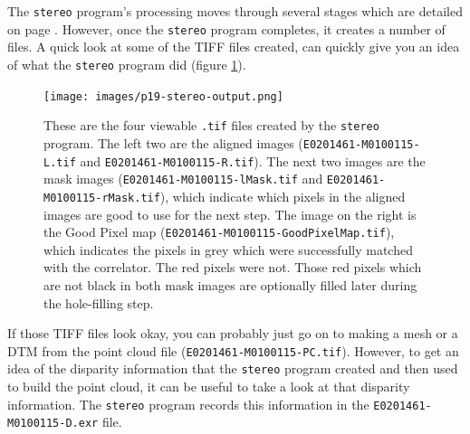 The \texttt{stereo} program's processing moves through several
stages which are detailed on page \pageref{entrypoints}.  However,
once the \texttt{stereo} program completes, it creates a number of
files.  A quick look at some of the TIFF files created, can quickly
give you an idea of what the \texttt{stereo} program did (figure
\ref{p19-stereo-output}).


\begin{figure}
\begin{center}
\texttt{[image: images/p19-stereo-output.png]}
\caption[P19 stereo output images]{
    \label{p19-stereo-output}
	These are the four viewable \texttt{.tif} files created by
	the \texttt{stereo} program.  The left two are the aligned
	images (\texttt{E0201461-M0100115-L.tif} and
	\texttt{E0201461-M0100115-R.tif}).  The next two images are
	the mask images (\texttt{E0201461-M0100115-lMask.tif} and
	\texttt{E0201461-M0100115-rMask.tif}), which indicate which
	pixels in the aligned images are good to use for the next
	step.  The image on the right is the Good Pixel map
	(\texttt{E0201461-M0100115-GoodPixelMap.tif}), which indicates
	the pixels in grey which were successfully matched with the
	correlator.  The red pixels were not.  Those red pixels which 
	are not black in both mask images are optionally filled later
	during the hole-filling step.
    }
\end{center}
\end{figure}

% 

If those TIFF files look okay, you can probably just go on to making
a mesh or a DTM from the point cloud file
(\texttt{E0201461-M0100115-PC.tif}).  However, to get an idea of
the disparity information that the \texttt{stereo} program created
and then used to build the point cloud, it can be useful to take a
look at that disparity information.  The \texttt{stereo} program
records this information in the \texttt{E0201461-M0100115-D.exr}
file.

